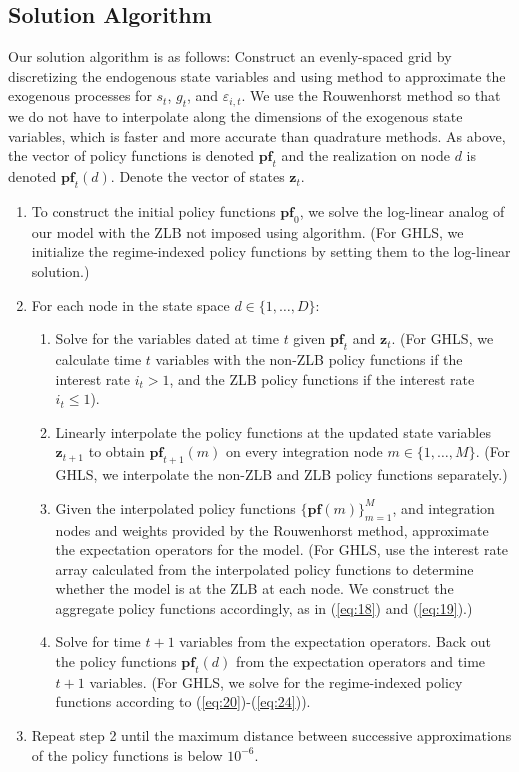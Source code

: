 \documentclass[12pt, final]{article}
\begin{document}
\subsection{Solution Algorithm}
Our solution algorithm is as follows: Construct an evenly-spaced grid by discretizing the endogenous state variables and using \hyperlink{Rouwenhorst}{\color{black}{Rouwenhorst (1995)}} method to approximate the exogenous processes for $s_t$, $g_t$, and $\varepsilon_{i,t}$. We use the Rouwenhorst method so that we do not have to interpolate along the dimensions of the exogenous state variables, which is faster and more accurate than quadrature methods.  As above, the vector of policy functions is denoted $\textbf{pf}_t$ and the realization on node $d$ is denoted $\textbf{pf}_t(d)$. Denote the vector of states $\textbf{z}_t$. 
\begin{enumerate} 
\item To construct the initial policy functions $\textbf{pf}_0$, we solve the log-linear analog of our model with the ZLB not imposed using \hyperlink{Sims}{} algorithm. (For GHLS, we initialize the regime-indexed policy functions by setting them to the log-linear solution.)
\item For each node in the state space $d \in \{1,\dots,D\}:$
\begin{enumerate}
\item Solve for the variables dated at time $t$ given $\textbf{pf}_t$ and $\textbf{z}_t$. (For GHLS, we calculate time $t$ variables with the non-ZLB policy functions if the interest rate $i_t > 1$, and the ZLB policy functions if the interest rate $i_t \leq 1$). 
\item  Linearly interpolate the policy functions at the updated state variables $\textbf{z}_{t+1}$ to obtain $\textbf{pf}_{t+1}(m)$ on every integration node $m \in \{1,\dots,M\}$. (For GHLS, we interpolate the non-ZLB and ZLB policy functions separately.)
\item Given the interpolated policy functions $\{\textbf{pf}(m)\}_{m=1}^M$, and integration nodes and weights provided by the Rouwenhorst method, approximate the expectation operators for the model. (For GHLS, use the interest rate array calculated from the interpolated policy functions to determine whether the model is at the ZLB at each node. We construct the aggregate policy functions accordingly, as in (\ref{eq:18}) and (\ref{eq:19}).)
\item Solve for time $t+1$ variables from the expectation operators. Back out the policy functions $\textbf{pf}_t(d)$ from the expectation operators and time $t+1$ variables. (For GHLS, we solve for the regime-indexed policy functions according to (\ref{eq:20})-(\ref{eq:24})).
\end{enumerate}
\item Repeat step 2 until the maximum distance between successive approximations of the policy functions is below $10^{-6}$. 
\end{enumerate}
\end{document}
